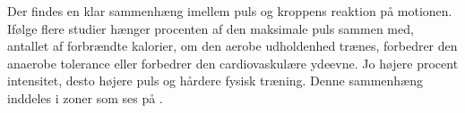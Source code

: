 Der findes en klar sammenhæng imellem puls og kroppens reaktion på motionen. Ifølge flere studier hænger procenten af den maksimale puls sammen med, antallet af forbrændte kalorier, om den aerobe udholdenhed trænes, forbedrer den anaerobe tolerance eller forbedrer den cardiovaskulære ydeevne. Jo højere procent intensitet, desto højere puls og hårdere fysisk træning. Denne sammenhæng inddeles i zoner som ses på . \citep{Leyland2007,Heartratejournal2015}
